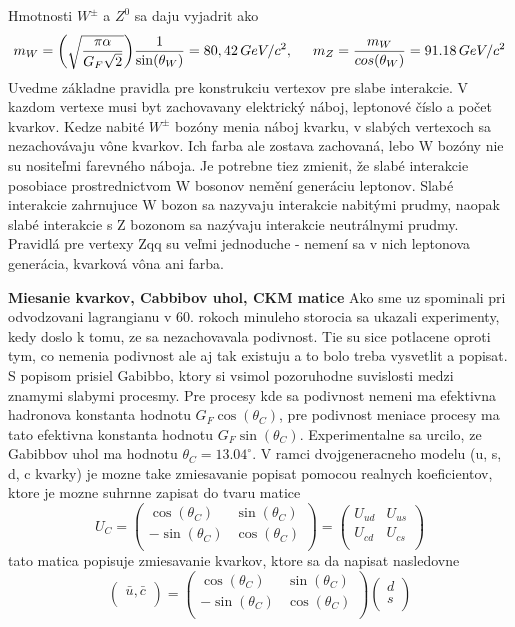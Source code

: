 \documentclass[../../main.tex]{subfiles}
\begin{document}
Hmotnosti $W^{\pm}$ a $Z^0$ sa daju vyjadrit ako 
$$
m_W=\bigg(\sqrt{\frac{\pi \alpha}{G_F\sqrt{2}}}\bigg)\frac{1}{\sin(\theta_W)}=80,42\,GeV/c^2, \hspace{0.5cm} m_Z=\frac{m_W}{cos(\theta_W)}=91.18\,GeV/c^2
$$
Uvedme základne pravidla pre konstrukciu vertexov pre slabe interakcie. V kazdom vertexe musi byt zachovavany elektrický náboj, leptonové číslo a počet kvarkov. Kedze nabité $W^{\pm}$ bozóny menia náboj kvarku, v slabých vertexoch sa nezachovávaju vône kvarkov. Ich farba ale zostava zachovaná, lebo W bozóny nie su nositeľmi farevného náboja. Je potrebne tiez zmienit, že slabé interakcie posobiace prostrednictvom W bosonov nemění generáciu leptonov. Slabé interakcie zahrnujuce W bozon sa nazyvaju interakcie nabitými prudmy, naopak slabé interakcie s Z bozonom sa nazývaju interakcie neutrálnymi prudmy. Pravidlá pre vertexy Zqq su veľmi jednoduche - nemení sa v nich leptonova generácia, kvarková vôna ani farba.\par
\textbf{Miesanie kvarkov, Cabbibov uhol, CKM matice}
Ako sme uz spominali pri odvodzovani lagrangianu v 60. rokoch minuleho storocia sa ukazali experimenty, kedy doslo k tomu, ze sa nezachovavala podivnost. Tie su sice potlacene oproti tym, co nemenia podivnost ale aj tak existuju a to bolo treba vysvetlit a popisat. S popisom prisiel Gabibbo, ktory si vsimol pozoruhodne suvislosti medzi znamymi slabymi procesmy. Pre procesy kde sa podivnost nemeni ma efektivna hadronova konstanta hodnotu $G_F\cos(\theta_C)$, pre podivnost meniace procesy ma tato efektivna konstanta hodnotu $G_F\sin(\theta_C)$. Experimentalne sa urcilo, ze Gabibbov uhol ma hodnotu $\theta_C=13.04^{\circ}$. V ramci dvojgeneracneho modelu (u, s, d, c kvarky) je mozne take zmiesavanie popisat pomocou realnych koeficientov, ktore je mozne suhrnne zapisat do tvaru matice
\[ U_C=
\begin{pmatrix}
    \cos(\theta_C) & \sin(\theta_C) \\
    -\sin(\theta_C) & \cos(\theta_C) \\
\end{pmatrix}=
\begin{pmatrix}
    U_{ud} & U_{us} \\
    U_{cd} & U_{cs} \\
\end{pmatrix}
\]
tato matica popisuje zmiesavanie kvarkov, ktore sa da napisat nasledovne 
\[
\begin{pmatrix}
    \bar{u},\bar{c} \\
\end{pmatrix}=
\begin{pmatrix}
    \cos(\theta_C) & \sin(\theta_C) \\
    -\sin(\theta_C) & \cos(\theta_C) \\
\end{pmatrix}
\begin{pmatrix}
    d \\
    s \\
\end{pmatrix}
\]
\end{document}
